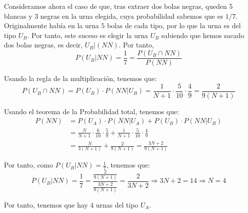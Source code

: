 \begin{ejercicio}
    Consideramos ahora el caso de que, tras extraer dos bolas negras, queden 5 blancas y 3 negras en la urna elegida, cuya probabilidad sabemos que es $1/7$. Originalmente había en la urna $5$ bolas de cada tipo, por lo que la urna es del tipo $U_B$. Por tanto, este suceso es elegir la urna $U_B$ sabiendo que hemos sacado dos bolas negras, es decir, $U_B|(NN)$. Por tanto,
    \begin{equation*}
        P(U_B | NN) = \frac{1}{7} = \frac{P(U_B\cap NN)}{P(NN)}
    \end{equation*}

    Usando la regla de la multiplicación, tenemos que:
    \begin{equation*}
        P(U_B\cap NN) = P(U_B) \cdot P(NN|U_B) = \frac{1}{N+1} \cdot \frac{5}{10} \cdot \frac{4}{9} = \frac{2}{9(N+1)}
    \end{equation*}

    Usando el teorema de la Probabilidad total, tenemos que:
    \begin{equation*}\begin{split}
        P(NN) & = P(U_A)\cdot P(NN|U_A) + P(U_B)\cdot P(NN|U_B)\\
        &= \frac{N}{N+1}\cdot \frac{6}{10}\cdot \frac{5}{9} + \frac{1}{N+1}\cdot \frac{5}{10}\cdot \frac{4}{9} \\
        & = \frac{N}{3(N+1)} + \frac{2}{9(N+1)} = \frac{3N + 2}{9(N+1)}
    \end{split}\end{equation*}

    Por tanto, como $P(U_B|NN)=\frac{1}{7}$, tenemos que:
    \begin{equation*}
        P(U_B | NN) = \frac{1}{7} = \frac{\displaystyle \frac{2}{9(N+1)}}{\displaystyle \frac{3N + 2}{9(N+1)}} = \frac{2}{3N+2} \Longrightarrow 3N+2 = 14 \Longrightarrow N=4
    \end{equation*}

    Por tanto, tenemos que hay $4$ urnas del tipo $U_A$.
\end{ejercicio}

